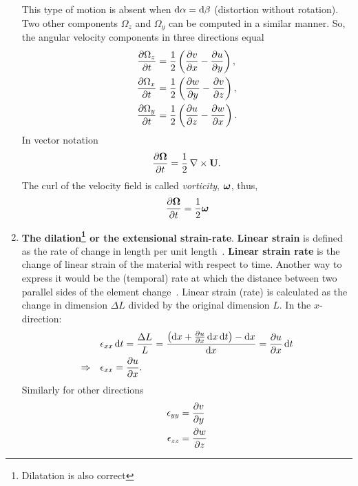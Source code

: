 \begin{enumerate}
\begin{equation}
        \end{equation}
        This type of motion is absent when \(\mathop{}\!\mathrm{d}\alpha = \mathop{}\!\mathrm{d}\beta\) (distortion without rotation).
        Two other components \(\Omega_z\) and \(\Omega_y\) can be computed in a similar manner.
        So, the angular velocity components in three directions equal~\cite{ghazanfarian2024applied}
        \begin{equation}
          \begin{aligned}
            \frac{\partial \Omega_z}{\partial t} &= \frac{1}{2} \left(\frac{\partial v}{\partial x} - \frac{\partial u}{\partial y}\right), \\
            \frac{\partial \Omega_x}{\partial t} &= \frac{1}{2} \left(\frac{\partial w}{\partial y} - \frac{\partial v}{\partial z}\right), \\
            \frac{\partial \Omega_y}{\partial t} &= \frac{1}{2} \left(\frac{\partial u}{\partial z} - \frac{\partial w}{\partial x}\right).
        \end{aligned}
          \label{eq:angular-velocity-components}
        \end{equation}
        In vector notation
        \begin{equation}
          \frac{\partial \boldsymbol{\mathbf{\Omega}}}{\partial t} = \frac{1}{2} \mathop{}\!\nabla\times\mathbf{U}.
          \label{eq:angular-velocity-vector-notation}
        \end{equation}
        The curl of the velocity field is called \emph{vorticity}, \(\boldsymbol{\mathbf{\omega}}\), thus,
        \begin{equation}
          \frac{\partial \boldsymbol{\mathbf{\Omega}}}{\partial t} = \frac{1}{2} \boldsymbol{\mathbf{\omega}}
          \label{eq:vorticity-and-angular-velocity}
        \end{equation}
  \item \textbf{The dilation\footnote{Dilatation is also correct} or the extensional strain-rate}.\quad
    \textbf{Linear strain} is defined as the rate of change in length per unit length~\cite{courseUniGeBottaro}.
    \textbf{Linear strain rate} is the change of linear strain of the material with respect to time.
    Another way to express it would be the (temporal) rate at which the distance between two parallel sides of the element change~\cite{ghazanfarian2024applied}.
    Linear strain (rate) is calculated as the change in dimension \(\Delta L\) divided by the original dimension \(L\).
    In the \(x\)-direction:
    \begin{equation}
      \begin{aligned}
      &\epsilon_{xx} \d t = \f{\Delta L}{L} = \f{\left(\d x + \ddx{u} \d x \d t\right) - \d x}{\d x} = \ddx{u} \d t \\
        \implies\quad &\epsilon_{xx} = \ddx{u}.
      \end{aligned}
      \label{eq:linear-strain-x-direction}
    \end{equation}
    Similarly for other directions
    \begin{equation}
      \begin{aligned}
        \epsilon_{yy} &= \ddy{v} \\
        \epsilon_{zz} &= \ddz{w}
      \end{aligned}
      \label{eq:linear-strain-rate-y-and-z-direction}
    \end{equation}


\end{enumerate}
